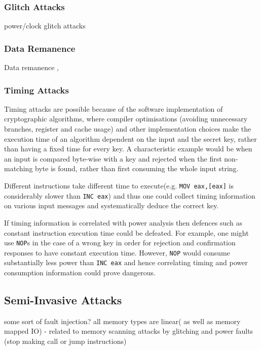 \documentclass[10pt,a4paper,twocolumn]{article}
\begin{document}
	\subsubsection{Glitch Attacks}
	power/clock glitch attacks
	\subsubsection{Data Remanence}
	Data remanence \citep{anderson:tamper_resistance}\citep{gutman:memory_remanence},
	\subsubsection{Timing Attacks}
	Timing attacks are possible because of the software implementation of cryptographic algorithms, where compiler optimisations (avoiding unnecessary branches, register and cache usage) and other implementation choices make the execution time of an algorithm dependent on the input and the secret key, rather than having a fixed time for every key. A characteristic example would be when an input is compared byte-wise with a key and rejected when the first non-matching byte is found, rather than first consuming the whole input string.
	
	Different instructions take different time to execute(e.g. \texttt{MOV eax,[eax]} is considerably slower than \texttt{INC eax}) and thus one could collect timing information on various input messages and systematically deduce the correct key. 
	
	If timing information is correlated with power analysis then defences such as constant instruction execution time could be defeated. For example, one might use \texttt{NOP}s in the case of a wrong key in order for rejection and confirmation responses to have constant execution time. However, \texttt{NOP} would consume substantially less power than \texttt{INC eax} and hence correlating timing and power consumption information could prove dangerous.

	\subsection{Semi-Invasive Attacks}
	some sort of fault injection?
		all memory types are linear( as well as memory mapped IO) - related to memory scanning attacks by glitching and power faults (stop making call or jump instructions)
\end{document}

